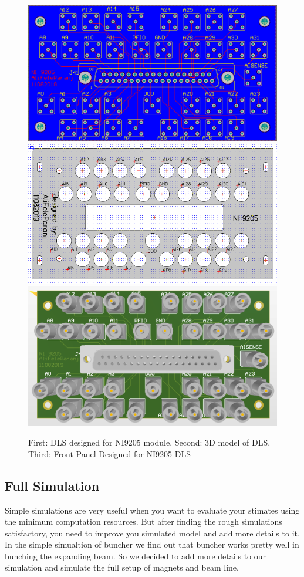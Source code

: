 \documentclass{article}
\begin{document}
\begin{figure}[h]
\centering
\includegraphics[scale=0.17]{ni9205_pcb}
\includegraphics[scale=0.27]{ni9205panel}
\includegraphics[scale=0.27]{ni9205_3d}
\caption{First: DLS designed for NI9205 module, Second: 3D model of DLS, Third: Front Panel Designed for NI9205 DLS}
\label{NI}
\end{figure}



\subsection{Full Simulation}
‌Simple simulations are very useful when you want to evaluate your stimates using the minimum computation resources. But after finding the rough simulations satisfactory, you need to improve you simulated model and add more details to it. In the simple simualtion of buncher we find out that buncher works pretty well in bunching the expanding beam. So we decided to add more details to our simulation and simulate the full setup of magnets and beam line.
\end{document}
